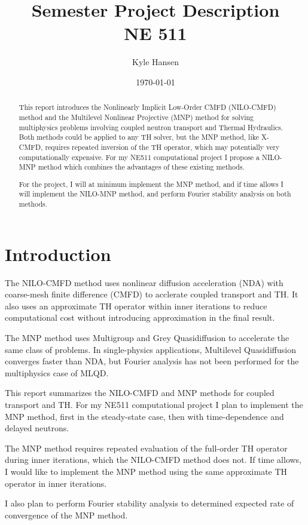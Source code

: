 \documentclass{proposal}
\title{\huge{Semester Project Description}\\\Large{NE 511}}
\author{Kyle Hansen}
\date{\today}
\begin{document}
\maketitle
\begin{abstract}
    This report introduces the Nonlinearly Implicit Low-Order CMFD (NILO-CMFD) method and the Multilevel Nonlinear Projective (MNP) method for solving multiphysics problems involving coupled neutron transport and Thermal Hydraulics. Both methods could be applied to any TH solver, but the MNP method, like X-CMFD, requires repeated inversion of the TH operator, which may potentially very computationally expensive. For my NE511 computational project I propose a NILO-MNP method which combines the advantages of these existing methods.

    For the project, I will at minimum implement the MNP method, and if time allows I will implement the NILO-MNP method, and perform Fourier stability analysis on both methods.
\end{abstract}

\section{Introduction}\label{sec:intro}

The NILO-CMFD method uses nonlinear diffusion acceleration (NDA) with coarse-mesh finite difference (CMFD) to acclerate coupled transport and TH. It also uses an approximate TH operator within inner iterations to reduce computational cost without introducing approximation in the final result.

The MNP method uses Multigroup and Grey Quasidiffusion to accelerate the same class of problems. In single-physics applications, Multilevel Quasidiffusion converges faster than NDA, but Fourier analysis has not been performed for the multiphysics case of MLQD.

This report summarizes the NILO-CMFD and MNP methods for coupled transport and TH. For my NE511 computational project I plan to implement the MNP method, first in the steady-state case, then with time-dependence and delayed neutrons.

The MNP method requires repeated evaluation of the full-order TH operator during inner iterations, which the NILO-CMFD method does not. If time allows, I would like to implement the MNP method using the same approximate TH operator in inner iterations.

I also plan to perform Fourier stability analysis to determined expected rate of convergence of the MNP method.
\end{document}
